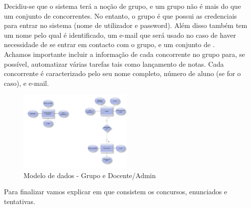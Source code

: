 Decidiu-se que o sistema terá a noção de grupo, e um grupo não é mais do que um conjunto de concorrentes. No entanto,
o grupo é que possui as credenciais para entrar no sistema (nome de utilizador e password). 
Além disso também tem um nome pelo qual é identificado, um e-mail que será usado no caso de haver necessidade de se entrar em contacto
com o grupo, e um conjunto de .\\

Achamos importante incluir a informação de cada concorrente no grupo para, se possível, automatizar várias tarefas tais como lançamento de notas.
Cada concorrente é caracterizado pelo seu nome completo, número de aluno (se for o caso), e e-mail.\\

\begin{figure}[htbp]
\begin{center}
\includegraphics[width=0.5\textwidth]{Images/grupo-docente}
\caption{Modelo de dados - Grupo e Docente/Admin}\label{fig modedados-grupo-doc}
\end{center}
\end{figure}


Para finalizar vamos explicar em que consistem os concursos, enunciados e tentativas.

